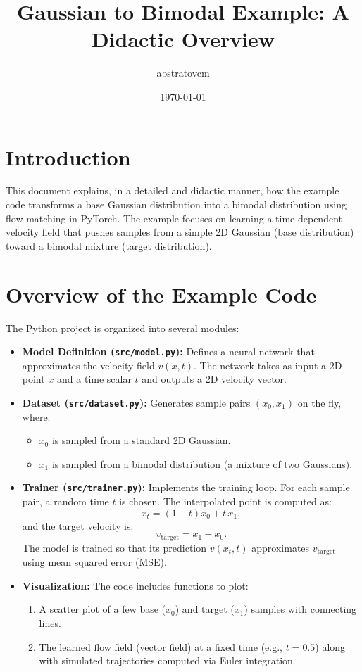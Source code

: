 \documentclass[12pt,a4paper]{article}
\title{Gaussian to Bimodal Example: A Didactic Overview}
\author{abstratovcm}
\date{\today}
\begin{document}
\maketitle

\tableofcontents
\newpage

\section{Introduction}

This document explains, in a detailed and didactic manner, how the example code transforms a base Gaussian distribution into a bimodal distribution using flow matching in PyTorch. The example focuses on learning a time-dependent velocity field that pushes samples from a simple 2D Gaussian (base distribution) toward a bimodal mixture (target distribution).

\section{Overview of the Example Code}

The Python project is organized into several modules:
\begin{itemize}
    \item \textbf{Model Definition (\texttt{src/model.py}):}  
    Defines a neural network that approximates the velocity field \( v(x,t) \). The network takes as input a 2D point \( x \) and a time scalar \( t \) and outputs a 2D velocity vector.
    
    \item \textbf{Dataset (\texttt{src/dataset.py}):}  
    Generates sample pairs \((x_0,x_1)\) on the fly, where:
    \begin{itemize}
        \item \( x_0 \) is sampled from a standard 2D Gaussian.
        \item \( x_1 \) is sampled from a bimodal distribution (a mixture of two Gaussians).
    \end{itemize}
    
    \item \textbf{Trainer (\texttt{src/trainer.py}):}  
    Implements the training loop. For each sample pair, a random time \( t \) is chosen. The interpolated point is computed as:
    \[
    x_t = (1-t)x_0 + t\,x_1,
    \]
    and the target velocity is:
    \[
    v_{\text{target}} = x_1 - x_0.
    \]
    The model is trained so that its prediction \( v(x_t,t) \) approximates \( v_{\text{target}} \) using mean squared error (MSE).
    
    \item \textbf{Visualization:}  
    The code includes functions to plot:
    \begin{enumerate}
        \item A scatter plot of a few base (\( x_0 \)) and target (\( x_1 \)) samples with connecting lines.
        \item The learned flow field (vector field) at a fixed time (e.g., \( t=0.5 \)) along with simulated trajectories computed via Euler integration.
    \end{enumerate}
\end{itemize}
\end{document}
